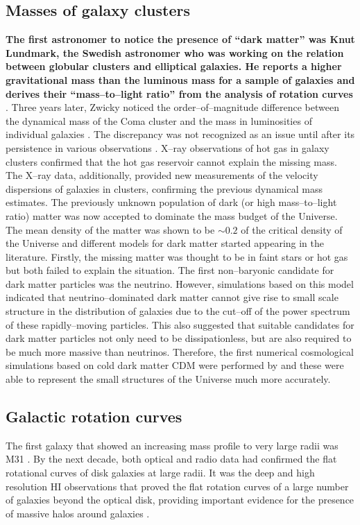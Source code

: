 \documentclass[a4wide,12pt]{book}
\begin{document}
\subsection{Masses of galaxy clusters}
{\bf The first astronomer to notice the presence of ``dark matter'' was Knut Lundmark, the Swedish astronomer who was working on the relation between globular clusters and elliptical galaxies. He reports a higher gravitational mass than the luminous mass for a sample of galaxies and derives their ``mass--to--light ratio'' from the analysis of rotation curves \citep[][]{Lundmark1930}}. Three years later, Zwicky noticed the order--of--magnitude difference between the dynamical mass of the Coma cluster and the mass in luminosities of individual galaxies \citep[][]{Zwicky1933}. The discrepancy was not recognized as an issue until after its persistence in various observations \citep[][]{Rubin.Ford1970, Einasto+1974, Ostriker+1974}. X--ray observations of hot gas in galaxy clusters confirmed that the hot gas reservoir cannot explain the missing mass. The X--ray data, additionally, provided new measurements of the velocity dispersions of galaxies in clusters, confirming the previous dynamical mass estimates. The previously unknown population of dark (or high mass--to--light ratio) matter was now accepted to dominate the mass budget of the Universe. The mean density of the matter was shown to be $\sim 0.2$ of the critical density of the Universe and different models for dark matter started appearing in the literature. Firstly, the missing matter was thought to be in faint stars or hot gas but both failed to explain the situation. The first non--baryonic candidate for dark matter particles was the neutrino. However, simulations based on this model \citep[][]{Doroshkevich+1978} indicated that neutrino--dominated dark matter cannot give rise to small scale structure in the distribution of galaxies due to the cut--off of the power spectrum of these rapidly--moving particles. This also suggested that suitable candidates for dark matter particles not only need to be dissipationless, but are also required to be much more massive than neutrinos. Therefore, the first numerical cosmological simulations based on cold dark matter CDM were performed by \citet[][]{Melott+1983} and these were able to represent the small structures of the Universe much more accurately.

\subsection{Galactic rotation curves}
The first galaxy that showed an increasing mass profile to very large radii was M31 \citep[][]{Rubin.Ford1970}. By the next decade, both optical and radio data had confirmed the flat rotational curves of disk galaxies at large radii. It was the deep and high resolution HI observations that proved the flat rotation curves of a large number of galaxies beyond the optical disk, providing important evidence for the presence of massive halos around galaxies \citep[see e.g.][]{Bosma1981, Begeman1989}. 
\end{document}
